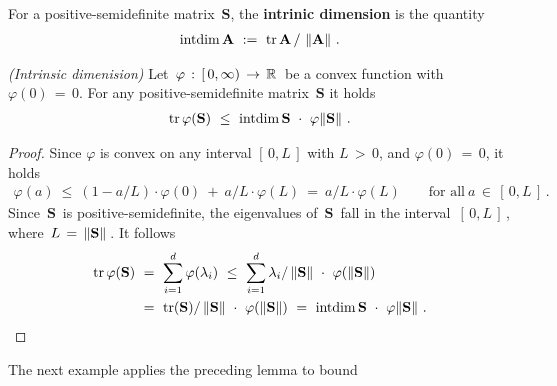 \begin{definition*}
  \label{rmineq_intrinsic_bernstein}
  For a positive-semidefinite matrix $\,\mathbf{S}$,
  the \textbf{intrinic dimension} is the quantity
  \begin{gather*}
    \mathrm{intdim}
    \,
    \mathbf{A}
    \ 
    :=
    \ 
\mathrm{tr}\,\mathbf{A}
\,
/
\,
\norm{\mathbf{A}}
    \,
    .
  \end{gather*}
\end{definition*}
\begin{lemma*}
  \emph{(Intrinsic dimenision)}
  Let 
  $
  \,
    \varphi\,:\, [\,0,\infty) \,\to\, \mathbb{R}
    \,
  $
  be a convex function with
  $
    \varphi(0)\,=\,0
  $.
  For any positive-semidefinite matrix $\,\mathbf{S}$ it holds 
  \begin{gather*}
    \mathrm{tr}\,\varphi(\mathbf{S})
    \ 
    \le
    \ 
    \mathrm{intdim}\,\mathbf{S}
    \ 
    \cdot
    \ 
    \varphi\!\norm{\mathbf{S}}
    \,
    .
  \end{gather*}
\end{lemma*}
\begin{proof}
  \emph{\cite[Lemma~7.5.1]{Tropp2015}}
  Since $\varphi$ is convex on any interval $[\,0,L\,]$ with $L\,>\,0$, and $\varphi(0)\,=\,0$, it holds
  \begin{gather*}
    \varphi(a)
    \ 
    \le
    \ 
    \left( 
      1 - a/L
    \right)
    \cdot
    \varphi(0)
    \ 
    +
    \ 
    a/L
    \cdot
    \varphi(L)
    \ 
    =
    \ 
    a/L
    \cdot
    \varphi(L)
    \qquad
    \text{for all}\ 
    a \,\in\, [\,0,L\,]
    \,
    .
  \end{gather*}
  Since $\,\mathbf{S}\,$ is positive-semidefinite, the eigenvalues of $\,\mathbf{S}\,$ 
  fall in the interval $\,[\,0,L\,]\,$, where $\,L\,=\,\left\lVert\mathbf{S}\right\rVert\,$.
  It follows 
  \begin{align*}
    \mathrm{tr}\,\varphi(\mathbf{S})
    &
    \ 
    =
    \ 
    \sum_{i=1}^{d}
    \varphi(\lambda_i)
    \ 
    \le
    \ 
    \sum_{i=1}^{d}
    \lambda_i
    /
    \norm{\mathbf{S}}
    \ 
    \cdot
    \ 
    \varphi(\norm{\mathbf{S}})
    \\
    &
    \ 
    =
    \ 
    \mathrm{tr}(\mathbf{S})
    /
    \norm{\mathbf{S}}
    \ 
    \cdot
    \ 
    \varphi(\norm{\mathbf{S}})
    \ 
    =
    \ 
    \mathrm{intdim}\,\mathbf{S}
    \ 
    \cdot
    \ 
    \varphi\!\norm{\mathbf{S}}
    \,
    .
  \end{align*}
\end{proof}
The next example applies the preceding lemma to bound 
